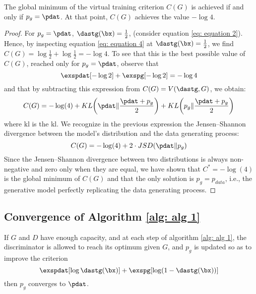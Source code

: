 \begin{theorem}
	The global minimum of the virtual training criterion $C(G)$ is achieved if and only if $p_g=\pdat$. At that point, $C(G)$ achieves the value $-\log4$.\label{thm: theorem 1}
\end{theorem}

\begin{proof}
	For $p_g=\pdat$, $\dastg(\bx)=\frac{1}{2}$, (consider equation \ref{eq: equation 2}). Hence, by inspecting equation \ref{eq: equation 4} at $\dastg(\bx)=\frac{1}{2}$, we find $C(G)=\log\frac{1}{2}+\log\frac{1}{2}=-\log4$. To see that this is the best possible value of $C(G)$, reached only for $p_g=\pdat$, observe that
	\begin{equation*}
		\exspdat[-\log2]+\exspg[-\log2]=-\log4
	\end{equation*}
	and that by subtracting this expression from $C(G)=V(\dastg,G)$, we obtain:
	\begin{equation}
		C(G)=-\log(4)+KL\bigg(\pdat\Vert\frac{\pdat+p_g}{2}\bigg)+KL\bigg(p_g\Vert\frac{\pdat+p_g}{2}\bigg)
	\end{equation}
	where \acrshort{kl} is the \Acrlong{kl}. We recognize in the previous expression the Jensen–Shannon divergence between the model’s distribution and the data generating process:
	\begin{equation}
		C(G)=-\log(4)+2\cdot JSD(\pdat\Vert p_g)
	\end{equation}
	Since the Jensen–Shannon divergence between two distributions is always non-negative and zero only when they are equal, we have shown that $C^{\ast}=-\log(4)$ is the global minimum of $C(G)$ and that the only solution is $p_g=p_{data}$, i.e., the generative model perfectly replicating the data generating process.
\end{proof}

\subsection{Convergence of Algorithm \ref{alg: alg 1}}\label{sec: convergence}
\begin{proposition}
	If $G$ and $D$ have enough capacity, and at each step of algorithm \ref{alg: alg 1}, the discriminator is allowed to reach its optimum given $G$, and $p_g$ is updated so as to improve the criterion
	\begin{equation*}
		\exspdat[\log\dastg(\bx)] + \exspg[\log(1-\dastg(\bx))]
	\end{equation*}
	then $p_g$ converges to $\pdat$.
\end{proposition}

